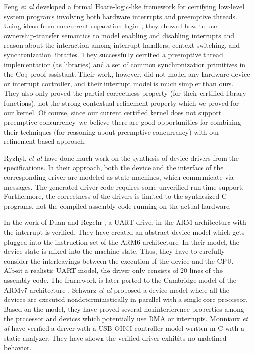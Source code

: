 Feng {\em et al} \cite{feng08:aim,feng09:jar} developed a formal Hoare-logic-like
framework for certifying low-level system programs involving both
hardware interrupts and preemptive threads.  Using ideas from
concurrent separation logic~\cite{ohearn:concur04}, they showed how to
use ownership-transfer semantics to model enabling and disabling
interrupts and reason about the interaction among interrupt handlers,
context switching, and synchronization libraries.  They successfully
certified a preemptive thread implementation (as libraries) and a set
of common synchronization primitives in the Coq proof assistant.
Their work, however, did not model any hardware device or interrupt
controller, and their interrupt model is much simpler than ours. They
also only proved the partial correctness property (for their certified
library functions), not the strong contextual refinement property
which we proved for our kernel. Of course, since our current certified
kernel does not support preemptive concurrency, we believe there are
good opportunities for combining their techniques (for reasoning about
preemptive concurrency) with our refinement-based approach.

Ryzhyk {\em et al} \cite{Ryzhyk_09,Ryzhyk14} have done much work on
the synthesis of device drivers from the specifications.
In their approach, both the device and the interface of the corresponding
driver are modeled as state machines, which communicate via messages. 
The generated driver code requires some unverified run-time
support. Furthermore, the correctness of the drivers is limited to the
synthesized C programs, not the compiled assembly code running on the actual
hardware. 

In the work of Duan and Regehr \cite{Duan2010}, a UART driver in the
ARM architecture with the interrupt is verified. They have created an
abstract device model which gets plugged into the instruction set of
the ARM6 architecture.  In their model, the device state is mixed into
the machine state. Thus, they have to carefully consider the
interleavings between the execution of the device and the CPU. Albeit
a realistic UART model, the driver only consists of 20 lines of the
assembly code. The framework is later ported to the Cambridge model of
the ARMv7 architecture \cite{duan2013}.  Schwarz {\em et al}
\cite{Oliver2014} proposed a device model where all the devices are
executed nondeterministically in parallel with a single core
processor. Based on the model, they have proved several
noninterference properties among the processor and devices which
potentially use DMA or interrupts.  Monniaux {\em et al}
\cite{Monniaux_EMSOFT07} have verified a driver with a USB OHCI
controller model written in C with a static analyzer.  They have
shown the verified driver exhibits no undefined behavior.

